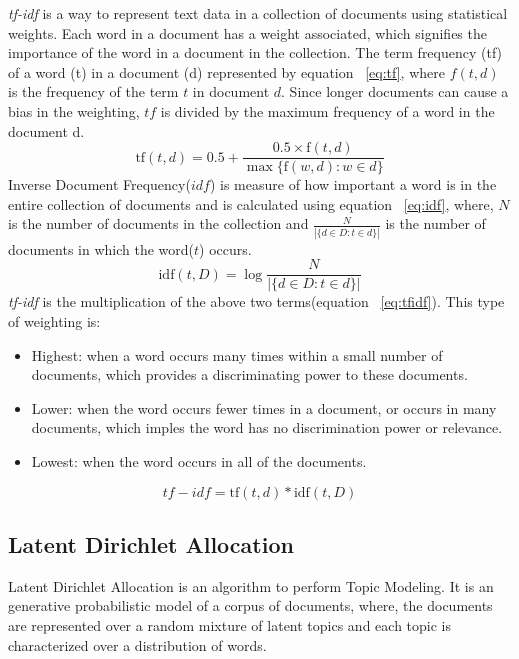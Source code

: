\emph{tf-idf} is a way to represent text data in a collection of documents using statistical weights. Each word in a document has a weight associated, which signifies the importance of the word in a document in the collection. The term frequency (tf) of a word (t) in a document (d) represented by equation ~\ref{eq:tf}, where $f(t,d)$ is the frequency of the term $t$ in document $d$. Since longer documents can cause a bias in the weighting, $tf$ is divided by the maximum frequency of a word in the document d.
\begin{equation}\label{eq:tf}
\mathrm{tf}(t,d) = 0.5 + \frac{0.5 \times \mathrm{f}(t, d)}{\max\{\mathrm{f}(w, d):w \in d\}}
\end{equation}
Inverse Document Frequency($idf$) is measure of how important a word is in the entire collection of documents and is calculated using equation ~\ref{eq:idf}, where, $N$ is the number of documents in the collection and $\frac{N}{|\{d \in D: t \in d\}|}$ is the number of documents in which the word($t$) occurs.
\begin{equation}\label{eq:idf}
 \mathrm{idf}(t, D) =  \log \frac{N}{|\{d \in D: t \in d\}|}
\end{equation}
\emph{tf-idf} is the multiplication of the above two terms(equation ~\ref{eq:tfidf}). This type of weighting is:
\begin{itemize}
\item Highest: when a word occurs many times within a small number of documents, which provides a discriminating power to these documents.
\item Lower: when the word occurs fewer times in a document, or occurs in many documents, which imples the word has no discrimination power or relevance.
\item Lowest: when the word occurs in all of the documents.
\end{itemize}
\begin{equation} \label{eq:tfidf}
 tf-idf = \mathrm{tf}(t,d)  * \mathrm{idf}(t, D)  
\end{equation}


\subsection{Latent Dirichlet Allocation}

Latent Dirichlet Allocation\citep{Blei} is an algorithm to perform Topic Modeling. It is an generative probabilistic model of a corpus of documents, where, the documents are  represented over a random mixture of latent topics and each topic is characterized over a distribution of words. 

